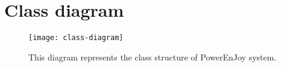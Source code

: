 \newpage
\section{Class diagram}

\begin{figure}[H]
	\centering
	\texttt{[image: class-diagram]}
	\caption[Class diagram]{This diagram represents the class structure of PowerEnJoy system.}
	\label{fig:class-diagram}
\end{figure}